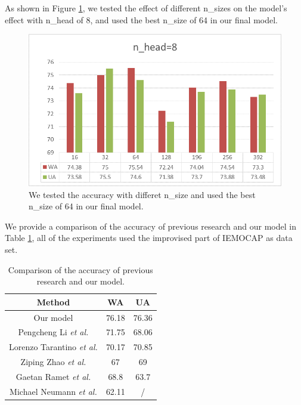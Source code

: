 \documentclass[10pt, conference, compsocconf]{IEEEtran}
\begin{document}
As shown in Figure \ref{SizeResult}, we tested the effect of different n\_sizes on the model's effect with n\_head of 8, and used the best n\_size of 64 in our final model.

\begin{figure}[h]
	
	\centering
	\includegraphics[width=0.95\linewidth]{pic/n_head8}
	\caption{We tested the accuracy with differet n\_size and used the best n\_size of 64 in our final model.}
	\label{SizeResult}
\end{figure}

We provide a comparison of the accuracy of previous research and our model in Table \ref{previous}, all of the experiments used the improvised part of IEMOCAP as data set.

\begin{table}[h]
	\renewcommand\arraystretch{1.5}
	\setlength{\abovecaptionskip}{-0.2cm}
	\caption{Comparison of the accuracy of previous research and our model.}
	\label{previous}
	\begin{center}  
		\begin{tabular}{|c|c|c|} 
			\hline  
			Method & WA & UA\\   
			\hline  
			Our model & 76.18 & 76.36 \\   
			\hline
			Pengcheng Li \emph{et al.}\cite{li2018attention} & 71.75 & 68.06 \\   			
			\hline
			Lorenzo Tarantino \emph{et al.}\cite{tarantino2019self} & 70.17 & 70.85 \\   
			\hline
			Ziping Zhao \emph{et al.}\cite{zhao2019attention} & 67 & 69 \\   
			\hline
			Gaetan Ramet \emph{et al.}\cite{ramet2018context} & 68.8 & 63.7 \\   
			\hline
			Michael Neumann \emph{et al.}\cite{neumann2017attentive} & 62.11 & / \\   
			\hline
		\end{tabular}  
	\end{center}  
\end{table}
\end{document}
